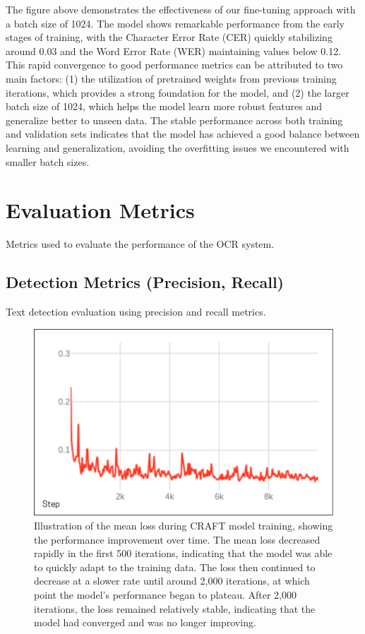 The figure above demonstrates the effectiveness of our fine-tuning approach with a batch size of 1024. 
The model shows remarkable performance from the early stages of training, with the Character 
Error Rate (CER) quickly stabilizing around 0.03 and the Word Error Rate (WER) maintaining 
values below 0.12. This rapid convergence to good performance metrics can be attributed to 
two main factors: (1) the utilization of pretrained weights from previous training iterations, 
which provides a strong foundation for the model, and (2) the larger batch size of 1024, which 
helps the model learn more robust features and generalize better to unseen data. The stable 
performance across both training and validation sets indicates that the model has achieved a 
good balance between learning and generalization, avoiding the overfitting issues we 
encountered with smaller batch sizes.


\section{Evaluation Metrics}
\label{sec:metrics}
Metrics used to evaluate the performance of the OCR system.

\subsection{Detection Metrics (Precision, Recall)}
\label{subsec:detection-metrics}
Text detection evaluation using precision and recall metrics.

\begin{figure}[ht]
    \centering
    \includegraphics[width=\textwidth]{figures/mean_loss_craft.png}
    \caption{Illustration of the mean loss during CRAFT model training, showing the performance 
    improvement over time. The mean loss decreased rapidly in the first 500 iterations, 
    indicating that the model was able to quickly adapt to the training data. The loss then 
    continued to decrease at a slower rate until around 2,000 iterations, at which point 
    the model's performance began to plateau. After 2,000 iterations, the loss remained 
    relatively stable, indicating that the model had converged and was no longer improving.}
    \label{fig:mean-loss-craft}
\end{figure}


